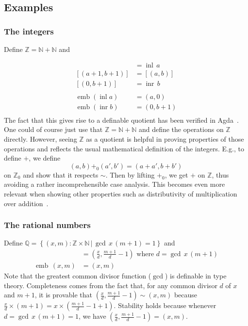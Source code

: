 \documentclass[envcountsame]{llncs}
\newcommand{\N}{\mathbb{N}}
\newcommand{\Q}{\mathbb{Q}}
\newcommand{\Z}{\mathbb{Z}}
\providecommand{\class}[1]{[#1]}
\providecommand{\set}  [1]{\left\{#1\right\}}
\DeclareMathOperator{\emb}{emb}
\DeclareMathOperator{\inl}{inl}
\DeclareMathOperator{\inr}{inr}
\begin{document}
\subsection{Examples}\label{sec:dquotients:examples}

\subsubsection*{The integers}
Define $\Z =\N + \N $ and 

\begin{align*}
\class{(a,0)} &= \inl\,a\\
\class{(a+1,b+1)} &= \class{(a,b)}\\
\class{(0,b+1)} &= \inr\,b\\\\
\emb (\inl a) &= (a,0)\\
\emb (\inr b) &= (0,b+1)\\
\end{align*}
The fact that this gives rise to a definable quotient has been verified in Agda~\cite{nuo:report:2010}.
 One could of course just use that $\Z=\N + \N$ and define the operations on $\Z$ directly. However, seeing  $\Z$ as a quotient is helpful in proving properties of those operations and reflects the usual mathematical definition of the integers. E.g., to define $+$, we define 
\[(a,b){+_0}(a', b')= (a+a',b+b')\]
on $\Z_0$ and show that it respects $\sim$. Then by lifting $+_0$, we get $+$ on $\Z$, thus avoiding a rather incomprehensible case analysis. This becomes even more relevant when showing other properties such as distributivity of multiplication over addition~\cite{nuo:report:2010}.

\subsubsection*{The rational numbers}

Define $\Q = \set{(x,m):\Z\times\N \,|\, \gcd\, x\,  (m+1) = 1}$ and
\begin{align*}
\class{(x,m)}&=\left(\frac{x}{d},\frac{m+1}{d}-1\right) \text{ where } d = \gcd\,x \,(m+1)\\
\emb \,(x,m) &= (x,m)
\end{align*}
Note that the greatest common divisor function ($\gcd$) is definable in type theory. Completeness comes from the fact that, for any common divisor $d$ of $x$ and $m+1$, it is provable that $\left(\frac x d,\frac {m+1} d-1\right)\sim\left(x,m\right)$ because $\frac x d \times (m+1) = x\times(\frac {m+1} d - 1+1)$.  Stability holds because whenever $d=\gcd\, x\, (m+1) = 1$, we have $\left(\frac{x}{d},\frac{m+1}{d}-1\right)=(x,m)$.    
\end{document}
